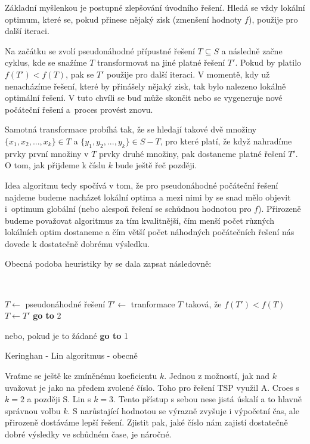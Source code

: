 \documentclass[
  biblatex,
  figures=false,
  glossaries,
  index
]{kidiplom}
\begin{document}
Základní myšlenkou je postupné zlepšování úvodního řešení. Hledá se vždy lokální optimum, které se, pokud přinese nějaký zisk (zmenšení hodnoty $f$), použije pro další iteraci.

Na začátku se zvolí pseudonáhodné přípustné řešení $T \subseteq S$ a následně začne cyklus, kde se snažíme $T$ transformovat na jiné platné řešení $T'$. Pokud by platilo $f(T') < f(T)$, pak se $T'$ použije pro další iteraci. V momentě, kdy už nenacházíme řešení, které by přinášely nějaký zisk, tak bylo nalezeno lokálně optimální řešení. V tuto chvíli se buď může skončit nebo se vygeneruje nové počáteční řešení a~proces provést znovu.

\sloppy Samotná transformace probíhá tak, že se hledají takové dvě množiny $\{{x_1, x_2, ..., x_k\} \in T}$ a $\{y_1, y_2, ..., y_k\} \in S - T$, pro které platí, že když nahradíme prvky první množiny v $T$ prvky druhé množiny, pak dostaneme platné řešení $T'$. O tom, jak přijdeme k číslu $k$ bude ještě řeč později.

Idea algoritmu tedy spočívá v tom, že pro pseudonáhodné počáteční řešení najdeme budeme nacházet lokální optima a mezi nimi by se snad mělo objevit i~optimum globální (nebo alespoň řešení se schůdnou hodnotou pro $f$). Přirozeně budeme považovat algoritmus za tím kvalitnější, čím menší počet různých lokálních optim dostaneme a čím větší počet náhodných počátečních řešení nás dovede k dostatečně dobrému výsledku.

Obecná podoba heuristiky by se dala zapsat následovně:\newline


{\LinesNumbered\SetAlgoNoLine\
\begin{algorithm}[H]
$T \leftarrow$ pseudonáhodné řešení\;
$T' \leftarrow$ tranformace $T$ taková, že $f(T') < f(T)$\;
{$T \leftarrow T'$\;
\textbf{go to} 2\;}
\Else
{
\Return{} nebo, pokud je to žádané \textbf{go to} 1\;
\caption{Keringhan - Lin algoritmus - obecně}
}
\end{algorithm}}\leavevmode\newline

Vraťme se ještě ke zmíněnému koeficientu $k$. Jednou z možností, jak nad $k$ uvažovat je jako na předem zvolené číslo. Toho pro řešení TSP využil A. Croes s $k = 2$ a později S. Lin s $k = 3$. Tento přístup s sebou nese jistá úskalí a to hlavně správnou volbu $k$. S narůstající hodnotou se výrazně zvyšuje i výpočetní čas, ale přirozeně dostáváme lepší řešení. Zjistit pak, jaké číslo nám zajistí dostatečně dobré výsledky ve schůdném čase, je náročné.
\end{document}

